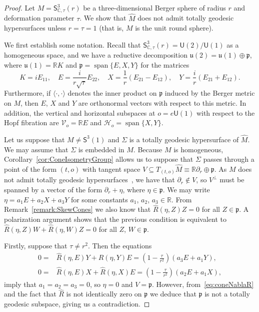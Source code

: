 \documentclass[11pt,a4paper,final]{amsart}
\newcommand{\s}{\mathsf}
\newcommand{\g}{\mathfrak}
\newcommand{\R}{\mathbb{R}}
\newcommand{\C}{\mathbb{C}}
\newcommand{\spann}{\operatorname{span}}
\renewcommand{\hat}{\widehat}
\theoremstyle{definition}
\begin{document}
\begin{proof}
	Let $M=\s{S}^{3}_{\C,\tau}(r)$ be a three-dimensional Berger sphere of radius $r$ and deformation parameter $\tau$.
	We show that $\hat{M}$ does not admit totally geodesic hypersurfaces unless $r=\tau=1$ (that is, $M$ is the unit round sphere).
	
	We first establish some notation.
	Recall that $\s{S}^{3}_{\C,\tau}(r)=\s{U}(2)/\s{U}(1)$ as a homogeneous space, and we have a reductive decomposition $\g{u}(2)=\g{u}(1)\oplus\g{p}$, where $\g{u}(1)=\R K$ and $\g{p}=\spann\{E,X,Y\}$ for the matrices
	\[
		K=iE_{11}, \quad E=\frac{i}{r\sqrt{\tau}}E_{22}, \quad X=\frac{1}{r}(E_{21}-E_{12}), \quad Y=\frac{i}{r}(E_{21}+E_{12}).
	\]
	Furthermore, if $\langle\cdot,\cdot \rangle$ denotes the inner product on $\g{p}$ induced by the Berger metric on $M$, then $E$, $X$ and $Y$ are orthonormal vectors with respect to this metric.
	In addition, the vertical and horizontal subspaces at $o=e\s{U}(1)$ with respect to the Hopf fibration are $\mathcal{V}_{o}=\R E$ and $\mathcal{H}_{o}=\spann\{X,Y\}$.
	
	Let us suppose that $M\neq \s{S}^{3}(1)$ and $\Sigma$ is a totally geodesic hypersurface of $\hat{M}$.
	We may assume that $\Sigma$ is embedded in $M$.
	Because $M$ is homogeneous, Corollary~\ref{cor:ConeIsometryGroup} allows us to suppose that $\Sigma$ passes through a point of the form $(t,o)$ with tangent space $V\subseteq T_{(t,o)}\hat{M}\equiv \R \partial_{r}\oplus \g{p}$.
	As $M$ does not admit totally geodesic hypersurfaces~\cite[Theorem~A]{RodriguezVazquezOlmos}, we have that $\partial_{r}\notin V$, so $V^{\perp}$ must be spanned by a vector of the form $\partial_{r}+\eta$, where $\eta\in \g{p}$.
	We may write $\eta=a_{1}E+a_{2}X+a_{3}Y$ for some constants $a_{1}$, $a_{2}$, $a_{3}\in\R$.
	From Remark~\ref{remark:SkewCones} we also know that $\hat{R}(\eta,Z)Z=0$ for all $Z\in \g{p}$.
	A polarization argument shows that the previous condition is equivalent to $\hat{R}(\eta,Z)W+\hat{R}(\eta,W)Z=0$ for all $Z$, $W\in\g{p}$.
	
	Firstly, suppose that $\tau\neq r^{2}$.
	Then the equations
	\[
		\begin{aligned}
			0=&{}\hat{R}(\eta,E)Y+\hat{R}(\eta,Y)E=\left(1-\frac{\tau}{r^{2}}\right)(a_{3}E+a_{1}Y), \\
			0=&{}\hat{R}(\eta,E)X+\hat{R}(\eta,X)E=\left(1-\frac{\tau}{r^{2}}\right)(a_{2}E+a_{1}X),
		\end{aligned}
	\]
	imply that $a_{1}=a_{2}=a_{3}=0$, so $\eta=0$ and $V=\g{p}$.
	However, from~\eqref{eq:coneNablaR} and the fact that $\hat{R}$ is not identically zero on $\g{p}$ we deduce that $\g{p}$ is not a totally geodesic subspace, giving us a contradiction. 
	

\end{proof}
\end{document}
